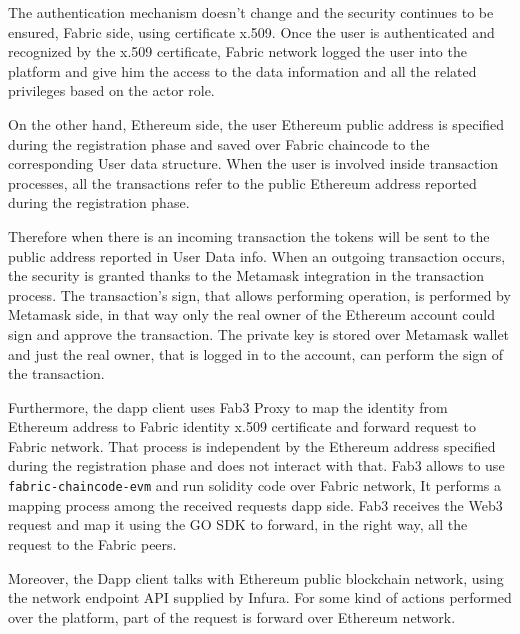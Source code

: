 The authentication mechanism doesn't change and the security continues to be ensured, Fabric side, using 
certificate x.509. Once the user is authenticated and recognized by the x.509 certificate, Fabric network 
logged the user into the platform and give him the access to the data information and all the related 
privileges based on the actor role.
\bigskip

On the other hand, Ethereum side, the user Ethereum public address is specified
during the registration phase and saved over Fabric chaincode to the corresponding User data structure.
When the user is involved inside transaction processes, all the transactions refer to the public Ethereum
address reported during the registration phase. 
\bigskip

Therefore when there is an incoming transaction the tokens will be sent to the public address reported in User Data info. 
When an outgoing transaction occurs, the security is granted thanks to the Metamask integration in the 
transaction process. The transaction's sign, that allows performing operation, is performed by Metamask side, 
in that way only the real owner of the Ethereum account could sign and approve the transaction. The private 
key is stored over Metamask wallet and just the real owner, that is logged in to the account, can perform 
the sign of the transaction. 
\bigskip  

Furthermore, the dapp client uses Fab3 Proxy to map the identity from Ethereum address to Fabric
identity x.509 certificate and forward request to Fabric network. That process is independent by the Ethereum address
specified during the registration phase and does not interact with that. Fab3 allows to use \texttt{fabric-chaincode-evm} 
and run solidity code over Fabric network, It performs a mapping process among the received requests dapp side.
Fab3 receives the Web3 request and map it using the GO SDK to forward, in the right way, all the request
to the Fabric peers. 
\bigskip

Moreover, the Dapp client talks with Ethereum public blockchain network, using the network endpoint API supplied by Infura. 
For some kind of actions performed over the platform, part of the request is forward over Ethereum network. 

